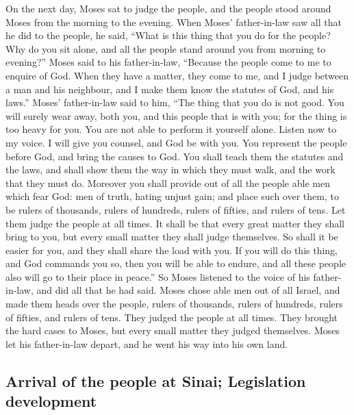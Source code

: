  On the next day, Moses sat to judge the people, and the
people stood around Moses from the morning to the evening.
 When Moses' father-in-law saw all that he did to the
people, he said, ``What is this thing that you do for the people? Why do
you sit alone, and all the people stand around you from morning to
evening?''  Moses said to his father-in-law, ``Because
the people come to me to enquire of God.  When they have
a matter, they come to me, and I judge between a man and his neighbour,
and I make them know the statutes of God, and his laws.''
 Moses' father-in-law said to him, ``The thing that you
do is not good.  You will surely wear away, both you, and
this people that is with you; for the thing is too heavy for you. You
are not able to perform it yourself alone.  Listen now to
my voice. I will give you counsel, and God be with you. You represent
the people before God, and bring the causes to God.  You
shall teach them the statutes and the laws, and shall show them the way
in which they must walk, and the work that they must do. 
Moreover you shall provide out of all the people able men which fear
God: men of truth, hating unjust gain; and place such over them, to be
rulers of thousands, rulers of hundreds, rulers of fifties, and rulers
of tens.  Let them judge the people at all times. It
shall be that every great matter they shall bring to you, but every
small matter they shall judge themselves. So shall it be easier for you,
and they shall share the load with you.  If you will do
this thing, and God commands you so, then you will be able to endure,
and all these people also will go to their place in peace.''
 So Moses listened to the voice of his father-in-law, and
did all that he had said.  Moses chose able men out of
all Israel, and made them heads over the people, rulers of thousands,
rulers of hundreds, rulers of fifties, and rulers of tens.
 They judged the people at all times. They brought the
hard cases to Moses, but every small matter they judged themselves.
 Moses let his father-in-law depart, and he went his way
into his own land.

\hypertarget{arrival-of-the-people-at-sinai-legislation-development}{%
\subsection{Arrival of the people at Sinai; Legislation
development}\label{arrival-of-the-people-at-sinai-legislation-development}}

